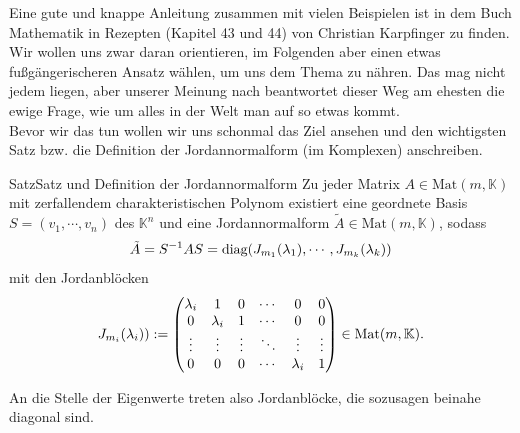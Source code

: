 Eine gute und knappe Anleitung zusammen mit vielen Beispielen ist in dem Buch \glqq{}Mathematik in Rezepten\grqq{} (Kapitel 43 und 44) von Christian Karpfinger zu finden. Wir wollen uns zwar daran orientieren, im Folgenden aber einen etwas \glqq{}fußgängerischeren\grqq{} Ansatz wählen, um uns dem Thema zu nähren. Das mag nicht jedem liegen, aber unserer Meinung nach beantwortet dieser Weg am ehesten die ewige Frage, \glqq{}wie um alles in der Welt man auf so etwas kommt\grqq{}. \\

Bevor wir das tun wollen wir uns schonmal das Ziel ansehen und den wichtigsten Satz bzw. die Definition der Jordannormalform (im Komplexen) anschreiben.

\begin{Satz}{Satz}{Satz und Definition der Jordannormalform}
    Zu jeder Matrix $A\in\text{Mat}(m,\mathbb{K})$ mit zerfallendem charakteristischen Polynom existiert eine geordnete Basis $S=(v_1, \cdots, v_n)$ des $\mathbb{K}^n$ und eine Jordannormalform $\tilde{A}\in\text{Mat}(m,\mathbb{K})$, sodass
    \begin{equation*}
        \tilde{A} = S^{-1}AS=\text{diag}(J_{m_1}(\lambda_1), \cdots, J_{m_k}(\lambda_k))
    \end{equation*}
    mit den Jordanblöcken
    \begin{equation*}
        J_{m_i}(\lambda_i)):=\begin{pmatrix}\lambda_i & 1 & 0 & \cdots & 0 & 0\\ 0 & \lambda_i & 1 & \cdots & 0 & 0\\ \vdots & \vdots & \vdots & \ddots & \vdots & \vdots \\ 0 & 0 & 0 & \cdots & \lambda_i & 1\end{pmatrix} \in \text{Mat}(m,\mathbb{K}).
    \end{equation*}
\end{Satz}
An die Stelle der Eigenwerte treten also Jordanblöcke, die sozusagen \glqq{}beinahe\grqq{} diagonal sind.
